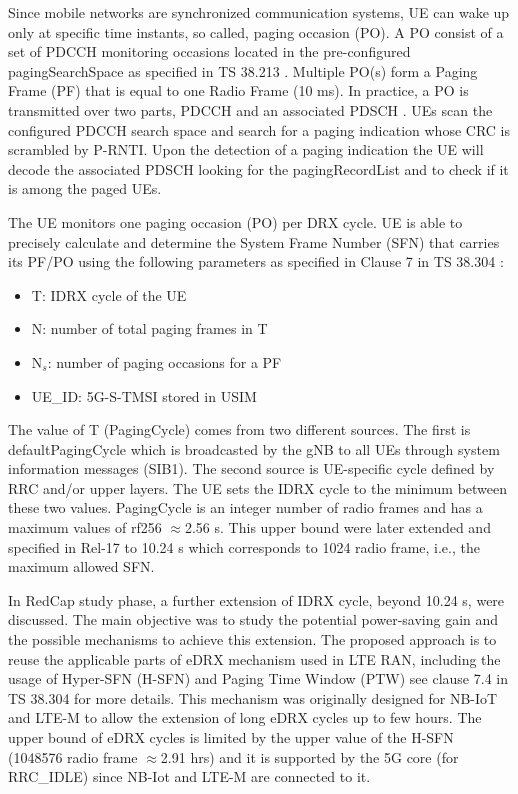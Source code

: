 \documentclass[conference]{IEEEtran}
\begin{document}
Since mobile networks are synchronized communication systems, UE can wake up only at specific time instants, so called, paging occasion (PO). A PO consist of a set of PDCCH monitoring occasions located in the pre-configured pagingSearchSpace as specified in TS 38.213 \cite{3gpp_nr_2022-1_38.213}. Multiple PO(s) form a Paging Frame (PF) that is equal to one Radio Frame (10 ms). In practice, a PO is transmitted over two parts, PDCCH and an associated PDSCH \cite{esswie_power_2022}. UEs scan the configured PDCCH search space and search for a paging indication whose CRC is scrambled by P-RNTI. Upon the detection of a paging indication the UE will decode the associated PDSCH looking for the pagingRecordList and to check if it is among the paged UEs.

The UE monitors one paging occasion (PO) per DRX cycle. UE is able to precisely calculate and determine the System Frame Number (SFN) that carries its PF/PO using the following parameters as specified in Clause 7 in TS 38.304 \cite{3gpp.38.304}:
 \begin{itemize}
     \item T: IDRX cycle of the UE
     \item N: number of total paging frames in T
     \item N$_{s}$: number of paging occasions for a PF
     \item UE\_ID: 5G-S-TMSI stored in USIM
 \end{itemize}



The value of T (PagingCycle) comes from two different sources. The first is defaultPagingCycle which is broadcasted by the gNB to all UEs through system information messages (SIB1). The second source is UE-specific cycle defined by RRC and/or upper layers. The UE sets the IDRX cycle to the minimum between these two values. PagingCycle is an integer number of radio frames and has a maximum values of rf256 $\approx$2.56 s. This upper bound were later extended and specified in Rel-17 to 10.24 s which corresponds to 1024 radio frame, i.e., the maximum allowed SFN.

In RedCap study phase, a further extension of IDRX cycle, beyond 10.24 s, were discussed. The main objective was to study the potential power-saving gain and the possible mechanisms to achieve this extension. The proposed approach is to reuse the applicable parts of eDRX mechanism used in LTE RAN, including the usage of Hyper-SFN (H-SFN) and Paging Time Window (PTW) see clause 7.4 in TS 38.304 for more details. This mechanism was originally designed for NB-IoT and LTE-M to allow the extension of long eDRX cycles up to few hours. The upper bound of eDRX cycles is limited by the upper value of the H-SFN (1048576 radio frame $\approx$2.91 hrs) and it is supported by the 5G core (for RRC\_IDLE) since NB-Iot and LTE-M are connected to it.
\end{document}
